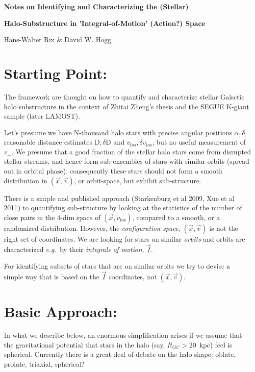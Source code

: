 \documentclass[12pt,a4paper,twoside]{article}
\newcommand{\D}{{\mathrm D}}
\newcommand{\dD}{\delta{\mathrm D}}
\newcommand{\vlos}{v_{los}}
\newcommand{\dvlos}{\delta\vlos}
\newcommand{\vperp}{v_\perp}
\newcommand{\vx}{\vec{x}}
\newcommand{\vv}{\vec{v}}
\newcommand{\vI}{\vec{I}}
\newcommand{\eg}{{\it e.g.~}}
\begin{document}
\centerline{\Large\bf Notes on Identifying and Characterizing the (Stellar)}
\centerline{\Large\bf Halo-Substructure in 'Integral-of-Motion' (Action?) Space}

\vspace{1em}
\centerline{\large Hans-Walter Rix \& David W. Hogg }
\vspace{0.5em}

\section{Starting Point:}

The framework are thought on how to quantify and characterize stellar Galsctic 
halo substructure in the context of Zhitai Zheng's thesis and the SEGUE K-giant sample (later LAMOST). 

Let's presume we have N-thousand halo stars with precise angular positions $\alpha,\delta$, 
reasonable distance estimates $\D,\dD$ and $\vlos,\dvlos$, but no useful measurement 
of $\vperp$. We presume that a good fraction of the stellar halo stars come from disrupted stellar streams, and hence form sub-ensembles of stars with similar orbits (spread out in orbital phase); consequently these stars should not form a smooth distribution in $(\vx,\vv)$, or orbit-space, but exhibit sub-structure. 

There is a simple and published approach (Starkenburg et al 2009, Xue et al 2011) to quantifying sub-structure by looking at the statistics of the number of close pairs in the 4-dim space of
$(\vx,\vlos)$, compared to a smooth, or a randomized distribution. However, the {\it configuration space}, $(\vx,\vv)$ is not the right set of coordinates. We are looking for stars on similar {\sl orbits} and orbits are characterized \eg by their {\sl integrals of motion}, $\vI$. 

For identifying subsets of stars that are on similar orbits we try to devise a simple way 
that is based on the $\vI$ coordinates, not $(\vx,\vv)$. 

\section{Basic Approach:}

In what we describe below, an enormous simplification arises if we assume that the gravitational potential that stars in the halo (say, $R_{GC}>20$~kpc) feel is spherical. Currently there is a great deal of debate on the halo shape: oblate, prolate, triaxial, spherical? 
\end{document}
